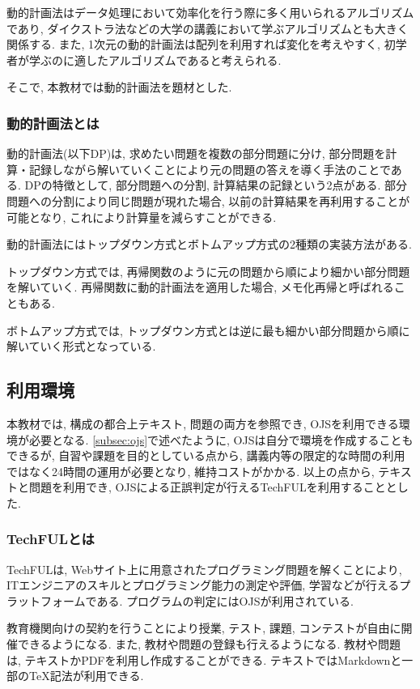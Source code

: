 動的計画法はデータ処理において効率化を行う際に多く用いられるアルゴリズムであり, ダイクストラ法などの大学の講義において学ぶアルゴリズムとも大きく関係する. 
また, 1次元の動的計画法は配列を利用すれば変化を考えやすく, 初学者が学ぶのに適したアルゴリズムであると考えられる. 

そこで, 本教材では動的計画法を題材とした. 

\subsubsection{動的計画法とは}
動的計画法(以下DP)は, 求めたい問題を複数の部分問題に分け, 部分問題を計算・記録しながら解いていくことにより元の問題の答えを導く手法のことである. 
DPの特徴として, 部分問題への分割, 計算結果の記録という2点がある. 
部分問題への分割により同じ問題が現れた場合, 以前の計算結果を再利用することが可能となり, これにより計算量を減らすことができる. 

動的計画法にはトップダウン方式とボトムアップ方式の2種類の実装方法がある. 

トップダウン方式では, 再帰関数のように元の問題から順により細かい部分問題を解いていく. 
再帰関数に動的計画法を適用した場合, メモ化再帰と呼ばれることもある. 

ボトムアップ方式では, トップダウン方式とは逆に最も細かい部分問題から順に解いていく形式となっている. 

\subsection{利用環境}
本教材では, 構成の都合上テキスト, 問題の両方を参照でき, OJSを利用できる環境が必要となる. 
\ref{subsec:ojs}で述べたように, OJSは自分で環境を作成することもできるが, 自習や課題を目的としている点から, 講義内等の限定的な時間の利用ではなく24時間の運用が必要となり, 維持コストがかかる. 
以上の点から, テキストと問題を利用でき, OJSによる正誤判定が行えるTechFUL\cite{TechFUL}を利用することとした. 

\subsubsection{TechFULとは}

TechFULは, Webサイト上に用意されたプログラミング問題を解くことにより, ITエンジニアのスキルとプログラミング能力の測定や評価, 学習などが行えるプラットフォームである. 
プログラムの判定にはOJSが利用されている. 

教育機関向けの契約を行うことにより授業, テスト, 課題, コンテストが自由に開催できるようになる. 
また, 教材や問題の登録も行えるようになる. 
教材や問題は, テキストかPDFを利用し作成することができる. 
テキストではMarkdownと一部のTeX記法が利用できる. 

